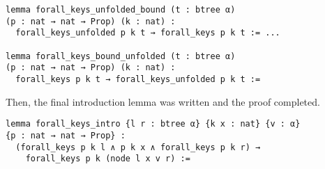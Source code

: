 \begin{lstlisting}
lemma forall_keys_unfolded_bound (t : btree α) 
(p : nat → nat → Prop) (k : nat) :
  forall_keys_unfolded p k t → forall_keys p k t := ...

lemma forall_keys_bound_unfolded (t : btree α) 
(p : nat → nat → Prop) (k : nat) :
  forall_keys p k t → forall_keys_unfolded p k t :=
\end{lstlisting}

Then, the final introduction lemma was written and the proof completed. 

\begin{lstlisting}
lemma forall_keys_intro {l r : btree α} {k x : nat} {v : α} 
{p : nat → nat → Prop} :
  (forall_keys p k l ∧ p k x ∧ forall_keys p k r) → 
    forall_keys p k (node l x v r) :=
\end{lstlisting}